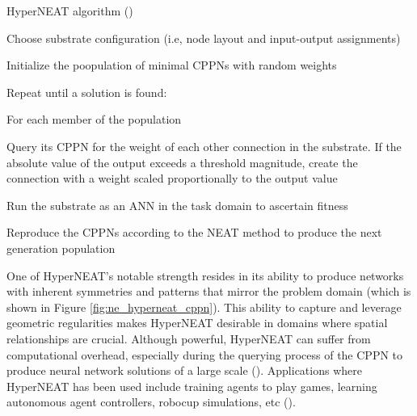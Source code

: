 \begin{algorithm}[H]
	\caption{HyperNEAT algorithm (\cite{stanley2009hypercube})}\label{alg:hyperneat_algorithm}
	\begin{algorithmic}[1]
        \item Choose substrate configuration (i.e, node layout and input-output assignments)
        \item Initialize the poopulation of minimal CPPNs with random weights
        \item Repeat until a solution is found:
        \item \:\: For each member of the population
        \item \:\:\:\: Query its CPPN for the weight of each other connection in the substrate. If the absolute value of the output exceeds a threshold magnitude, create the connection with a weight scaled proportionally to the output value
        \item \:\:\:\: Run the substrate as an ANN in the task domain to ascertain fitness
        \item \:\: Reproduce the CPPNs according to the NEAT method to produce the next generation population
    \end{algorithmic}
\end{algorithm}

\parbreak\noindent One of HyperNEAT's notable strength resides in its ability to produce networks with inherent symmetries and patterns that mirror the problem domain (which is shown in Figure \ref{fig:ne_hyperneat_cppn}). This ability to capture and leverage geometric regularities makes HyperNEAT desirable in domains where spatial relationships are crucial. Although powerful, HyperNEAT can suffer from computational overhead, especially during the querying process of the CPPN to produce neural network solutions of a large scale (\cite{stanley2009hypercube}). Applications where HyperNEAT has been used include training agents to play games, learning autonomous agent controllers, robocup simulations, etc (\cite{kowaliw2014growing}).